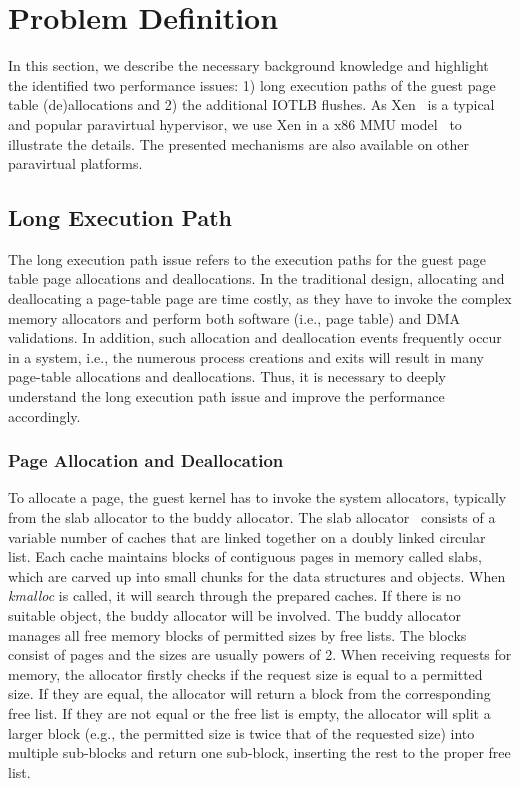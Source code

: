 \section{Problem Definition} \label{sec:prob}
In this section, we describe the necessary background knowledge and highlight the identified two performance issues: 1) long execution paths of the guest page table (de)allocations and 2) the additional IOTLB flushes.
As Xen~\cite{XEN-SOSP03} is a typical and popular paravirtual hypervisor, we use Xen in a x86 MMU model~\cite{x86-pv-model} to illustrate the details.
The presented mechanisms are also available on other paravirtual platforms.


\subsection{Long Execution Path}\label{sec:longpath}
The long execution path issue refers to the execution paths for the guest page table page allocations and deallocations.
In the traditional design, allocating and deallocating a page-table page are time costly, as they have to invoke the complex memory allocators and perform both software (i.e., page table) and DMA validations.
In addition, such allocation and deallocation events frequently occur in a system, i.e., the numerous process creations and exits will result in many page-table allocations and deallocations.
Thus, it is necessary to deeply understand the long execution path issue and improve the performance accordingly.

\subsubsection{Page Allocation and Deallocation}
To allocate a page, the guest kernel has to invoke the system allocators, typically from the slab allocator to the buddy allocator.
The slab allocator~\cite{slaballocator} consists of a variable number of caches that are linked together on a doubly linked circular list.
Each cache maintains blocks of contiguous pages in memory called slabs, which are carved up into small chunks for the data structures and objects.
When \emph{kmalloc} is called, it will search through the prepared caches.
If there is no suitable object, the buddy allocator will be involved.
The buddy allocator~\cite{buddyallocator} manages all free memory blocks of permitted sizes by free lists. The blocks consist of pages and the sizes are usually powers of 2.
When receiving requests for memory, the allocator firstly checks if the request size is equal to a permitted size. If they are equal, the allocator will return a block from the corresponding free list. If they are not equal or the free list is empty, the allocator will split a larger block (e.g., the permitted size is twice that of the requested size) into multiple sub-blocks and return one sub-block, inserting the rest to the proper free list. 

